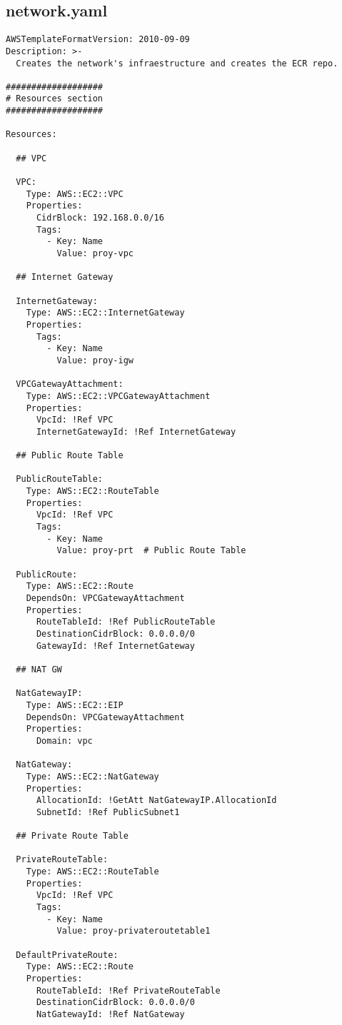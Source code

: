 \subsection{network.yaml}

\begin{verbatim}
AWSTemplateFormatVersion: 2010-09-09
Description: >-
  Creates the network's infraestructure and creates the ECR repo.

###################
# Resources section
###################

Resources:

  ## VPC

  VPC:
    Type: AWS::EC2::VPC
    Properties:
      CidrBlock: 192.168.0.0/16
      Tags:
        - Key: Name
          Value: proy-vpc

  ## Internet Gateway

  InternetGateway:
    Type: AWS::EC2::InternetGateway
    Properties:
      Tags:
        - Key: Name
          Value: proy-igw

  VPCGatewayAttachment:
    Type: AWS::EC2::VPCGatewayAttachment
    Properties:
      VpcId: !Ref VPC
      InternetGatewayId: !Ref InternetGateway

  ## Public Route Table

  PublicRouteTable:
    Type: AWS::EC2::RouteTable
    Properties:
      VpcId: !Ref VPC
      Tags:
        - Key: Name
          Value: proy-prt  # Public Route Table

  PublicRoute:
    Type: AWS::EC2::Route
    DependsOn: VPCGatewayAttachment
    Properties:
      RouteTableId: !Ref PublicRouteTable
      DestinationCidrBlock: 0.0.0.0/0
      GatewayId: !Ref InternetGateway

  ## NAT GW

  NatGatewayIP:
    Type: AWS::EC2::EIP
    DependsOn: VPCGatewayAttachment
    Properties:
      Domain: vpc

  NatGateway:
    Type: AWS::EC2::NatGateway
    Properties:
      AllocationId: !GetAtt NatGatewayIP.AllocationId
      SubnetId: !Ref PublicSubnet1

  ## Private Route Table

  PrivateRouteTable:
    Type: AWS::EC2::RouteTable
    Properties:
      VpcId: !Ref VPC
      Tags:
        - Key: Name
          Value: proy-privateroutetable1

  DefaultPrivateRoute:
    Type: AWS::EC2::Route
    Properties:
      RouteTableId: !Ref PrivateRouteTable
      DestinationCidrBlock: 0.0.0.0/0
      NatGatewayId: !Ref NatGateway


\end{verbatim}
